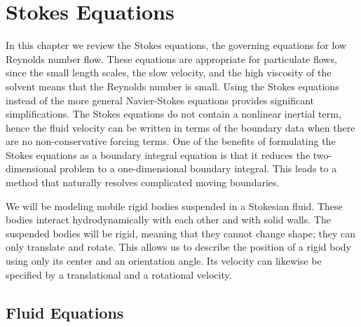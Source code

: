 \chapter{Stokes Equations}\label{chap:stokes}

In this chapter we review the Stokes equations, the governing equations for low Reynolds number flow. These equations are appropriate for particulate flows, since the small length scales, the slow velocity, and the high viscosity of the solvent means that the Reynolds number is small. Using the Stokes equations instead of the more general Navier-Stokes equations provides significant simplifications. The Stokes equations do not contain a nonlinear inertial term, hence the fluid velocity can be written in terms of the boundary data when there are no non-conservative forcing terms. One of the  benefits of formulating the Stokes equations as a boundary integral equation is that it reduces the two-dimensional problem to a one-dimensional boundary integral. This leads to a method that naturally resolves complicated moving boundaries.

We will be modeling mobile rigid bodies suspended in a Stokesian fluid. These bodies interact hydrodynamically with each other and with solid walls. The suspended bodies will be rigid, meaning that they cannot change shape; they can only translate and rotate. This allows us to describe the position of a rigid body using only its center and an orientation angle. Its velocity can likewise be specified by a translational and a rotational velocity. 

\section{Fluid Equations}


